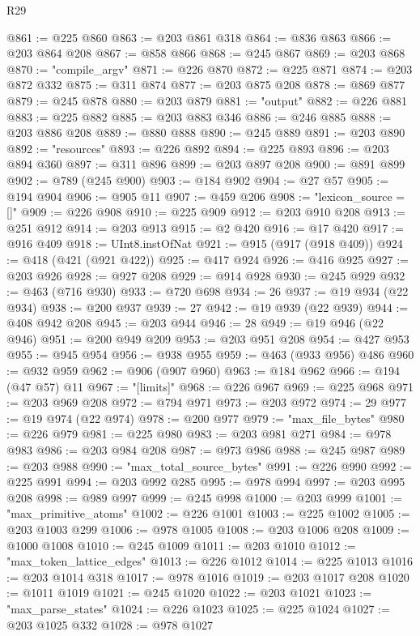 \begin{lexlean}{R29}
\begin{coremodule}
@861 := @225 @860
@863 := @203 @861 @318
@864 := @836 @863
@866 := @203 @864 @208
@867 := @858 @866
@868 := @245 @867
@869 := @203 @868
@870 := "compile_argv"
@871 := @226 @870
@872 := @225 @871
@874 := @203 @872 @332
@875 := @311 @874
@877 := @203 @875 @208
@878 := @869 @877
@879 := @245 @878
@880 := @203 @879
@881 := "output"
@882 := @226 @881
@883 := @225 @882
@885 := @203 @883 @346
@886 := @246 @885
@888 := @203 @886 @208
@889 := @880 @888
@890 := @245 @889
@891 := @203 @890
@892 := "resources"
@893 := @226 @892
@894 := @225 @893
@896 := @203 @894 @360
@897 := @311 @896
@899 := @203 @897 @208
@900 := @891 @899
@902 := @789 (@245 @900)
@903 := @184 @902
@904 := @27 @57
@905 := @194 @904
@906 := @905 @11
@907 := @459 @206
@908 := "lexicon_source = []"
@909 := @226 @908
@910 := @225 @909
@912 := @203 @910 @208
@913 := @251 @912
@914 := @203 @913
@915 := @2 @420
@916 := @17 @420
@917 := @916 @409
@918 := UInt8.instOfNat
@921 := @915 (@917 (@918 @409))
@924 := @418 (@421 (@921 @422))
@925 := @417 @924
@926 := @416 @925
@927 := @203 @926
@928 := @927 @208
@929 := @914 @928
@930 := @245 @929
@932 := @463 (@716 @930)
@933 := @720 @698
@934 := 26
@937 := @19 @934 (@22 @934)
@938 := @200 @937
@939 := 27
@942 := @19 @939 (@22 @939)
@944 := @408 @942 @208
@945 := @203 @944
@946 := 28
@949 := @19 @946 (@22 @946)
@951 := @200 @949 @209
@953 := @203 @951 @208
@954 := @427 @953
@955 := @945 @954
@956 := @938 @955
@959 := @463 (@933 @956) @486
@960 := @932 @959
@962 := @906 (@907 @960)
@963 := @184 @962
@966 := @194 (@47 @57) @11
@967 := "[limits]"
@968 := @226 @967
@969 := @225 @968
@971 := @203 @969 @208
@972 := @794 @971
@973 := @203 @972
@974 := 29
@977 := @19 @974 (@22 @974)
@978 := @200 @977
@979 := "max_file_bytes"
@980 := @226 @979
@981 := @225 @980
@983 := @203 @981 @271
@984 := @978 @983
@986 := @203 @984 @208
@987 := @973 @986
@988 := @245 @987
@989 := @203 @988
@990 := "max_total_source_bytes"
@991 := @226 @990
@992 := @225 @991
@994 := @203 @992 @285
@995 := @978 @994
@997 := @203 @995 @208
@998 := @989 @997
@999 := @245 @998
@1000 := @203 @999
@1001 := "max_primitive_atoms"
@1002 := @226 @1001
@1003 := @225 @1002
@1005 := @203 @1003 @299
@1006 := @978 @1005
@1008 := @203 @1006 @208
@1009 := @1000 @1008
@1010 := @245 @1009
@1011 := @203 @1010
@1012 := "max_token_lattice_edges"
@1013 := @226 @1012
@1014 := @225 @1013
@1016 := @203 @1014 @318
@1017 := @978 @1016
@1019 := @203 @1017 @208
@1020 := @1011 @1019
@1021 := @245 @1020
@1022 := @203 @1021
@1023 := "max_parse_states"
@1024 := @226 @1023
@1025 := @225 @1024
@1027 := @203 @1025 @332
@1028 := @978 @1027

\end{coremodule}
\end{lexlean}

